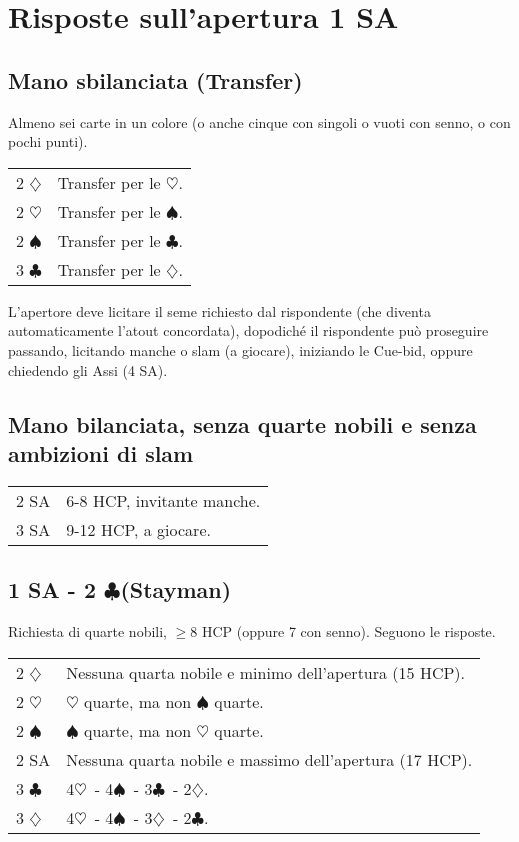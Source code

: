 \documentclass[a4paper,10pt]{article}
\renewcommand{\c}{$\clubsuit$\xspace}
\renewcommand{\d}{$\diamondsuit$\xspace}
\newcommand{\h}{$\heartsuit$\xspace}
\newcommand{\s}{$\spadesuit$\xspace}
\newcommand{\sa}{SA\xspace}
\newcommand{\smallspace}{\vskip0.3cm}
\newenvironment{twocol}
  {\smallspace\noindent\begin{tabular}{l p{0.8\textwidth}}}
  {\end{tabular}\smallspace}
\begin{document}
\section{Risposte sull'apertura 1 SA}

\subsection{Mano sbilanciata (Transfer)}

Almeno sei carte in un colore (o anche cinque con singoli o vuoti con senno, o con pochi punti).

\begin{twocol}
 2 \d & Transfer per le \h.\\
 2 \h & Transfer per le \s.\\
 2 \s & Transfer per le \c.\\
 3 \c & Transfer per le \d.\\
\end{twocol}

L'apertore deve licitare il seme richiesto dal rispondente (che diventa automaticamente l'atout concordata), dopodiché il rispondente può proseguire passando, licitando manche o slam (a giocare), iniziando le Cue-bid, oppure chiedendo gli Assi (4 \sa).


\subsection{Mano bilanciata, senza quarte nobili e senza ambizioni di slam}

\begin{twocol}
 2 \sa & 6-8 HCP, invitante manche.\\
 3 \sa & 9-12 HCP, a giocare.
\end{twocol}


\subsection{1 SA - 2 \c (Stayman)}

Richiesta di quarte nobili, $\geq 8$ HCP (oppure 7 con senno). Seguono le risposte.

\begin{twocol}
 2 \d & Nessuna quarta nobile e minimo dell'apertura (15 HCP).\\
 2 \h & \h quarte, ma non \s quarte.\\
 2 \s & \s quarte, ma non \h quarte.\\
 2 SA & Nessuna quarta nobile e massimo dell'apertura (17 HCP).\\
 3 \c & 4\h\ - 4\s\ - 3\c\ - 2\d.\\
 3 \d & 4\h\ - 4\s\ - 3\d\ - 2\c.\\
\end{twocol}
\end{document}
